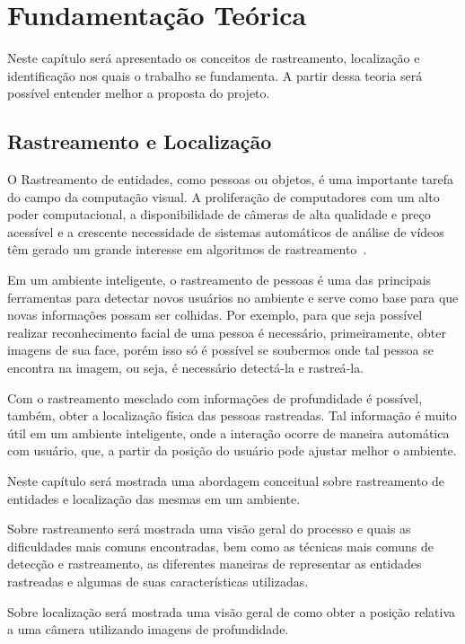 \chapter{Fundamentação Teórica}

	Neste capítulo será apresentado os conceitos de rastreamento, localização e identificação nos quais o trabalho se fundamenta. A partir dessa teoria será possível entender melhor a proposta do projeto.



\section{Rastreamento e Localização}

	O Rastreamento de entidades, como pessoas ou objetos, é uma importante tarefa do campo da computação visual. A proliferação de computadores com um alto poder computacional, a disponibilidade de câmeras de alta qualidade e preço acessível e a crescente necessidade de sistemas automáticos de análise de vídeos têm gerado um grande interesse em algoritmos de rastreamento~\cite{yilmaz}.

	Em um ambiente inteligente, o rastreamento de pessoas é uma das principais ferramentas para detectar novos usuários no ambiente e serve como base para que novas informações possam ser colhidas. Por exemplo, para que seja possível realizar reconhecimento facial de uma pessoa é necessário, primeiramente, obter imagens de sua face, porém isso só é possível se soubermos onde tal pessoa se encontra na imagem, ou seja, é necessário detectá-la e rastreá-la.

	Com o rastreamento mesclado com informações de profundidade é possível, também, obter a localização física das pessoas rastreadas. Tal informação é muito útil em um ambiente inteligente, onde a interação ocorre de maneira automática com usuário, que, a partir da posição do usuário pode ajustar melhor o ambiente.

	Neste capítulo será mostrada uma abordagem conceitual sobre rastreamento de entidades e localização das mesmas em um ambiente.

	Sobre rastreamento será mostrada uma visão geral do processo e quais as dificuldades mais comuns encontradas, bem como as técnicas mais comuns de detecção e rastreamento, as diferentes maneiras de representar as entidades rastreadas e algumas de suas características utilizadas.

	Sobre localização será mostrada uma visão geral de como obter a posição relativa a uma câmera utilizando imagens de profundidade.

